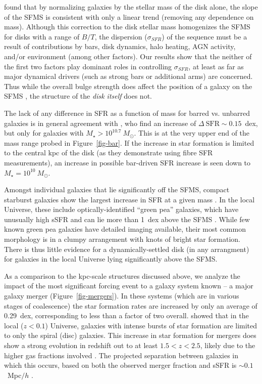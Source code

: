 \documentclass{emulateapj}
\begin{document}
\citet{abr14} found that by normalizing galaxies by the stellar mass of the disk alone, the slope of the SFMS is consistent with only a linear trend (removing any dependence on mass). Although this correction to the disk stellar mass homogenizes the SFMS for disks with a range of $B/T$, the dispersion ($\sigma_{SFR}$) of the sequence must be a result of contributions by bars, disk dynamics, halo heating, AGN activity, and/or environment (among other factors). Our results show that the neither of the first two factors play dominant roles in controlling $\sigma_{SFR}$, at least as far as major dynamical drivers (such as strong bars or additional arms) are concerned. Thus while the overall bulge strength does affect the position of a galaxy on the SFMS \citep{mar09,che12,fan13,lan14,oma14}, the structure of the \emph{disk itself} does not.

The lack of any difference in SFR as a function of mass for barred vs. unbarred galaxies is in general agreement with \citet{ell11}, who find an increase of $\Delta~\textrm{SFR}\sim0.15$~dex, but only for galaxies with $M_\star>10^{10.7}~M_\odot$. This is at the very upper end of the mass range probed in Figure~\ref{fig-bar}. If the increase in star formation is limited to the central kpc of the disk (as they demonstrate using fibre SFR measurements), an increase in possible bar-driven SFR increase is seen down to $M_\star=10^{10}~M_\odot$. 

Amongst individual galaxies that lie significantly off the SFMS, compact starburst galaxies show the largest increase in SFR at a given mass \citep{elb11}. In the local Universe, these include optically-identified ``green pea'' galaxies, which have unusually high sSFR and can lie more than 1~dex above the SFMS \citep{car09}. While few known green pea galaxies have detailed imaging available, their most common morphology is in a clumpy arrangement with knots of bright star formation. There is thus little evidence for a dynamically-settled disk (in any arrangment) for galaxies in the local Universe lying significantly above the SFMS. 

As a comparison to the kpc-scale structures discussed above, we analyze the impact of the most significant forcing event to a galaxy system known -- a major galaxy merger (Figure~\ref{fig-mergers}). In these systems (which are in various stages of coalescence) the star formation rates are increased by only an average of 0.29~dex, corresponding to less than a factor of two overall. \citet{dar10} showed that in the local ($z<0.1$) Universe, galaxies with intense bursts of star formation are limited to only the spiral (disc) galaxies. This increase in star formation for mergers does show a strong evolution in redshift out to at least $1.5<z<2.5$, likely due to the higher gas fractions involved \citep{dad10,rod11}. The projected separation between galaxies in which this occurs, based on both the observed merger fraction and sSFR is $\sim0.1$~Mpc$/h$ \citep{ski09}.
\end{document}
